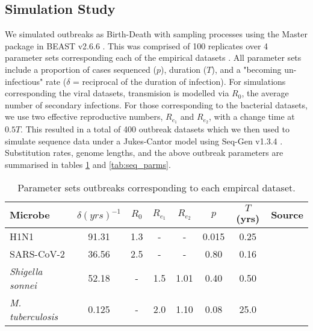 \documentclass{article}
\begin{document}
\begin{spacing}{1.5}
\subsection*{Simulation Study}
We simulated outbreaks as Birth-Death with sampling processes using the Master package in BEAST v2.6.6 \citep{vaughan_stochastic_2013,bouckaert_beast_2019}. This was comprised of 100 replicates over 4 parameter sets corresponding each of the empirical datasets . All parameter sets include a proportion of cases sequenced ($p$), duration ($T$), and a "becoming un-infectious" rate ($\delta$ = reciprocal of the duration of infection). For simulations corresponding the viral datasets, transmision is modelled via $R_0$, the average number of secondary infections. For those corresponding to the bacterial datasets, we use two effective reproductive numbers, $R_{e_1}$ and $R_{e_2}$, with a change time at $0.5T$. This resulted in a total of 400 outbreak datasets which we then used to simulate sequence data under a Jukes-Cantor model using Seq-Gen v1.3.4 \citep{rambaut_seq-gen_1997}. Substitution rates, genome lengths, and the above outbreak parameters are summarised in tables \ref{tab:sim_parms} and \ref{tab:seq_parms}.

\begin{table}[ht]
    \centering
    \caption{Parameter sets outbreaks corresponding to each empircal dataset.}
    \begin{tabular}{l|c|c|c|c|c|c|l|}
    \hline
    Microbe                     &   $\delta (yrs)^{-1}$    & $R_0$ &   $R_{e_1}$   &  $R_{e_2}$    &   $p$   &   $T$(yrs)   & Source \\
    \hline
    H1N1                        &   91.31    & 1.3 &   -   &  -    &   0.015   &   0.25 & \citet{hedge_2013_real-time} \\
    SARS-CoV-2                  &   36.56    & 2.5 &   -   &  -   &   0.80   &  0.16 & \citet{lane2021genomics} \\
    \textit{Shigella sonnei}    &   52.18    &  - &   1.5   &  1.01   &   0.40   &   0.50 & \citet{ingle_co-circulation_2019} \\
    \textit{M. tuberculosis}    &   0.125    &  - &   2.0   &  1.10    &   0.08   &   25.0 & \citet{kuhnert_tuberculosis_2018} \\
    \hline
    \end{tabular}
    \label{tab:sim_parms}
\end{table}


\end{spacing}
\end{document}
